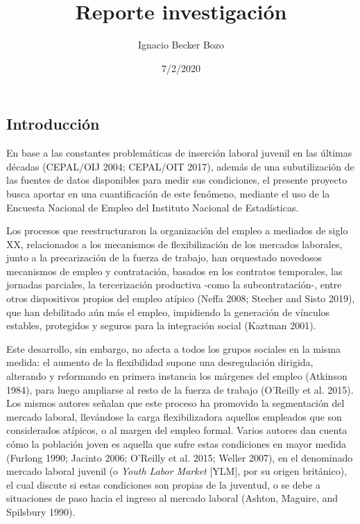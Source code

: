 \documentclass[]{article}
\title{Reporte investigación}
\author{Ignacio Becker Bozo}
\date{7/2/2020}
\begin{document}
\maketitle

\hypertarget{introducciuxf3n}{%
\subsection{Introducción}\label{introducciuxf3n}}

En base a las constantes problemáticas de inserción laboral juvenil en
las últimas décadas (CEPAL/OIJ 2004; CEPAL/OIT 2017), además de una
subutilización de las fuentes de datos disponibles para medir sus
condiciones, el presente proyecto busca aportar en una cuantificación de
este fenómeno, mediante el uso de la Encuesta Nacional de Empleo del
Instituto Nacional de Estadísticas.

Los procesos que reestructuraron la organización del empleo a mediados
de siglo XX, relacionados a los mecanismos de flexibilización de los
mercados laborales, junto a la precarización de la fuerza de trabajo,
han orquestado novedosos mecanismos de empleo y contratación, basados en
los contratos temporales, las jornadas parciales, la tercerización
productiva -como la subcontratación-, entre otros dispositivos propios
del empleo atípico (Neffa 2008; Stecher and Sisto 2019), que han
debilitado aún más el empleo, impidiendo la generación de vínculos
estables, protegidos y seguros para la integración social (Kaztman
2001).

Este desarrollo, sin embargo, no afecta a todos los grupos sociales en
la misma medida: el aumento de la flexibilidad supone una desregulación
dirigida, alterando y reformando en primera instancia los márgenes del
empleo (Atkinson 1984), para luego ampliarse al resto de la fuerza de
trabajo (O'Reilly et al. 2015). Los mismos autores señalan que este
proceso ha promovido la segmentación del mercado laboral, llevándose la
carga flexibilizadora aquellos empleados que son considerados atípicos,
o al margen del empleo formal. Varios autores dan cuenta cómo la
población joven es aquella que sufre estas condiciones en mayor medida
(Furlong 1990; Jacinto 2006; O'Reilly et al. 2015; Weller 2007), en el
denominado mercado laboral juvenil (o \emph{Youth Labor Market}
{[}YLM{]}, por su origen británico), el cual discute si estas
condiciones son propias de la juventud, o se debe a situaciones de paso
hacia el ingreso al mercado laboral (Ashton, Maguire, and Spilsbury
1990).
\end{document}
